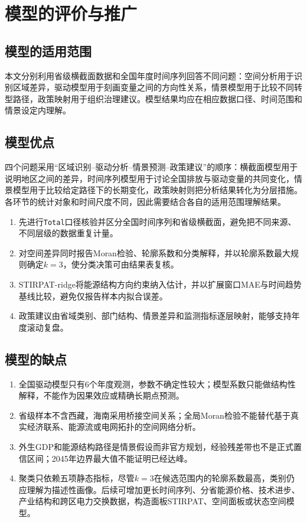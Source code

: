 \documentclass[12pt,a4paper]{ctexart}
\theoremstyle{definition}
\theoremstyle{plain}
\theoremstyle{remark}
\begin{document}
\section{模型的评价与推广}

\subsection{模型的适用范围}
本文分别利用省级横截面数据和全国年度时间序列回答不同问题：空间分析用于识别区域差异，驱动模型用于刻画变量之间的方向性关系，情景模型用于比较不同转型路径，政策映射用于组织治理建议。模型结果均应在相应数据口径、时间范围和情景设定内理解。

\subsection{模型优点}
四个问题采用“区域识别--驱动分析--情景预测--政策建议”的顺序：横截面模型用于说明地区之间的差异，时间序列模型用于讨论全国排放与驱动变量的共同变化，情景模型用于比较给定路径下的长期变化，政策映射则把分析结果转化为分层措施。各环节的统计对象和时间尺度不同，因此需要结合各自的适用范围理解结果。
\begin{enumerate}[label=(\arabic*)]
\item 先进行\texttt{Total}口径核验并区分全国时间序列和省级横截面，避免把不同来源、不同层级的数据重复计量。
\item 对空间差异同时报告Moran检验、轮廓系数和分类解释，并以轮廓系数最大规则确定$k=3$，使分类决策可由结果表复核。
\item STIRPAT-ridge将能源结构方向约束纳入估计，并以扩展窗口MAE与时间趋势基线比较，避免仅报告样本内拟合误差。
\item 政策建议由省域类别、部门结构、情景差异和监测指标逐层映射，能够支持年度滚动复盘。
\end{enumerate}

\subsection{模型的缺点}
\begin{enumerate}[label=(\arabic*)]
\item 全国驱动模型只有6个年度观测，参数不确定性较大；模型系数只能做结构性解释，不能作为因果效应或精确长期点预测。
\item 省级样本不含西藏，海南采用桥接空间关系；全局Moran检验不能替代基于真实经济联系、能源流或电网拓扑的空间网络分析。
\item 外生GDP和能源结构路径是情景假设而非官方规划，经验残差带也不是正式置信区间；2045年边界最大值不能证明已经达峰。
\item 聚类只依赖五项静态指标，尽管$k=3$在候选范围内的轮廓系数最高，类别仍应理解为描述性画像。后续可增加更长时间序列、分省能源价格、技术进步、产业结构和跨区电力交换数据，构造面板STIRPAT、空间面板或状态空间模型。
\end{enumerate}
\end{document}
